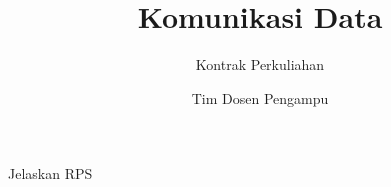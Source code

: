 \documentclass[pdflatex,compress]{beamer}
\title{Komunikasi Data}
\subtitle{Kontrak Perkuliahan}
\author{Tim Dosen Pengampu}
\begin{document}
\maketitle

\begin{frame}
	Jelaskan RPS
\end{frame}
\end{document}
